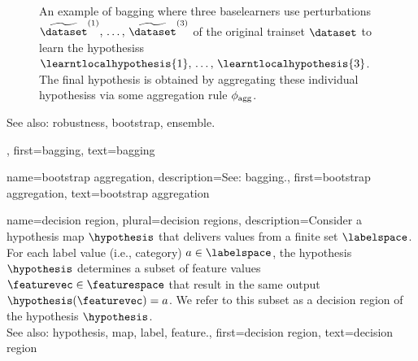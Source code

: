{{\begin{figure}[htbp]
\begin{center}
		\caption{An example of bagging where three \glspl{baselearner} use perturbations  
		$\widetilde{\dataset}^{(1)},\,\ldots,\,\widetilde{\dataset}^{(3)}$ of 
		the original \gls{trainset} $\dataset$ to learn the \glspl{hypothesis} 
		$\learntlocalhypothesis{1},\,\ldots,\,\learntlocalhypothesis{3}$. The final 
		\gls{hypothesis} is obtained by aggregating these individual \glspl{hypothesis} 
		via some aggregation rule $\phi_{\rm agg}$.}
		\end{center}
		\end{figure}
		See also: \gls{robustness}, \gls{bootstrap}, \gls{ensemble}.},
	first={bagging},
	text={bagging}
}

{name={bootstrap aggregation}, 
 description={See: \gls{bagging}.},
 first={bootstrap aggregation},
 text={bootstrap aggregation} 
}	

{name={decision region}, plural={decision regions}, 
	description={Consider 
		a \gls{hypothesis} \gls{map} $\hypothesis$ that delivers values from a finite set $\labelspace$. 
		For each \gls{label} value (i.e., category) $a \in \labelspace$, the \gls{hypothesis} $\hypothesis$ 
		determines a subset of \gls{feature} values $\featurevec \in \featurespace$ that result 
		in the same output $\hypothesis(\featurevec)=a$. We refer to this subset as a decision 
		region of the \gls{hypothesis} $\hypothesis$. \\
		See also: \gls{hypothesis}, \gls{map}, \gls{label}, \gls{feature}.},
	first={decision region},
	text={decision region} 
}

